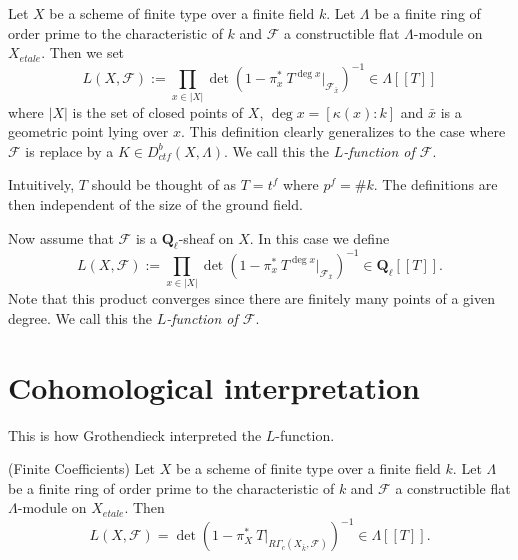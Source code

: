 \begin{definition}
\label{definition-L-function-finite-ring}
Let $X$ be a scheme of finite type over a finite field $k$. Let $\Lambda$ be a
finite ring of order prime to the characteristic of $k$ and $\mathcal{F}$ a
constructible flat $\Lambda$-module on $X_{etale}$. Then we set
$$
L(X, \mathcal{F}) := \prod_{x\in |X|}\det\left(1-\pi_x^*\ T^{\deg
x}\Big|_{\mathcal{F}_{\bar x}}\right)^{-1}\in \Lambda [[ T ]]
$$
where $|X|$ is the set of closed points of $X$, $\deg x = [\kappa(x): k]$ and
$\bar x$ is a geometric point lying over $x$. This definition clearly
generalizes to the case where $\mathcal{F}$ is replace by a
$K \in D_{ctf}^b(X, \Lambda)$. We call this the {\it $L$-function of
$\mathcal{F}$}.
\end{definition}

\begin{remark}
\label{remark-T}
Intuitively, $T$ should be thought of as $T = t^f$ where $p^f = \# k$. The
definitions are then independent of the size of the ground field.
\end{remark}

\begin{definition}
\label{definition-L-function-l-adic}
Now assume that $\mathcal{F}$ is a $\mathbf{Q}_\ell$-sheaf on $X$.
In this case we define
$$
L(X, \mathcal{F}) := \prod_{x\in |X|}\det\left(1-\pi_x^*\ T^{\deg
x}\Big|_{\mathcal{F}_{\bar x}}\right)^{-1}\in \mathbf{Q}_\ell [[ T ]].
$$
Note that this product converges since there are finitely many points of a
given degree. We call this the {\it $L$-function of
$\mathcal{F}$}.
\end{definition}




\section{Cohomological interpretation}
\label{section-L-cohomological}

\noindent
This is how Grothendieck interpreted the $L$-function.

\begin{theorem}
\label{theorem-A}
(Finite Coefficients)
Let $X$ be a scheme of finite type over a finite field $k$. Let $\Lambda$ be a
finite ring of order prime to the characteristic of $k$ and $\mathcal{F}$ a
constructible flat $\Lambda$-module on $X_{etale}$. Then
$$
L(X, \mathcal{F}) = \det\left(1-\pi_X^*\ T\Big|_{R\Gamma_c(X_{\bar k},
\mathcal{F})}\right)^{-1}\in \Lambda[[ T]].
$$
\end{theorem}

